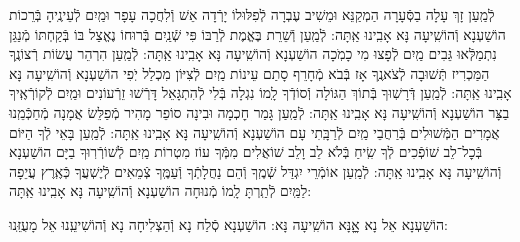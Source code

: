 \documentclass[twoside, openany, parskip=half, 11pt]{book}
\begin{document}
\begin{small}
לְֿמַֽעַן זָךְ עָלָה בַסְּֿעָרָה הַמְקַנֵּא וּמֵשִׁיב עֶבְרָה
לְֿפִלּוּלוֹ יָרְֿדָה אֵשׁ וְֿלִחֲכָה עָפָר וּמַֽיִם לְֿעֵינֶֽיהָ בְּֿרֵכוֹת הוֹשַׁעְנָא וְֿהוֹשִֽׁיעָה נָּא אָבִֽינוּ אַֽתָּה:
לְֿמַֽעַן וְֿשֵׁרֵת בֶּאֱמֶת לְֿרַבּוֹ פִּי שְֿׁנַֽיִם בְּֿרוּחוֹ נֶאֱצַל בּוֹ
בְּֿקַחְתּוֹ מְֿנַגֵּן נִתְמַלְּֿאוּ גֵּבִים מַֽיִם לְֿפָצוּ מִי כָמֹֽכָה הוֹשַׁעְנָא וְֿהוֹשִֽׁיעָה נָּא אָבִֽינוּ אַֽתָּה:
לְֿמַֽעַן הִרְהֵר עֲשׂוֹת רְֿצוֹנֶֽךָ הַמַּכְרִיז תְּֿשׁוּבָה לְֿצֹאנֶֽךָ
אָז בְּֿבֹא מְֿחָרֵף סָתַם עֵינוֹת מַֽיִם לְֿצִיּוֹן מִכְלַל יֹֽפִי הוֹשַׁעְנָא וְֿהוֹשִֽׁיעָה נָּא אָבִֽינוּ אַֽתָּה:
לְֿמַֽעַן דְּֿרָשֽׁוּךָ בְּֿתוֹךְ הַגּוֹלָה וְֿסוֹדְֿךָ לָֽמוֹ נִגְלָה
בְּֿלִי לְֿהִתְגָּאֵל דָּרְֿשׁוּ זֵרְֿעוֹנִים וּמַֽיִם לְֿקוֹרְֿאֶֽיךָ בַצָּר הוֹשַׁעְנָא וְֿהוֹשִֽׁיעָה נָּא אָבִֽינוּ אַֽתָּה:
לְֿמַֽעַן גָּמַר חׇכְמָה וּבִינָה סוֹפֵר מָהִיר מְֿפַלֵּשׂ אֲמָנָה
מְֿחַכְּֿמֵֽנוּ אֲמָרִים הַמְּֿשׁוּלִים בְּֿרַחֲבֵי מַֽיִם לְֿרַבָּֽתִי עָם הוֹשַׁעְנָא וְֿהוֹשִֽׁיעָה נָּא אָבִֽינוּ אַֽתָּה:
לְֿמַֽעַן בָּאֵי לְֿךָ הַיּוֹם בְּֿכׇל־לֵב שׁוֹפְֿכִים לְֿךָ שִֽׂיחַ בְּֿלֹא לֵב וָלֵב
שׁוֹאֲלִים מִמְּֿךָ עוֹז מִטְרוֹת מַֽיִם לְֿשׁוֹרְֿרֽוּךָ בַיָּם הוֹשַׁעְנָא וְֿהוֹשִֽׁיעָה נָּא אָבִֽינוּ אַֽתָּה:
לְֿמַֽעַן אוֹמְֿרֵי יִגְדַּל שְֿׁמֶֽךָ וְֿהֵם נַחֲלָתְֿךָ וְֿעַמֶּֽךָ
צְֿמֵאִים לְֿיֶשְׁעֲךָ כְּֿאֶֽרֶץ עֲיֵפָה לַמַּֽיִם לְֿתַֽרְתָּ לָֽמוֹ מְֿנוּחָה הוֹשַׁעְנָא וְֿהוֹשִֽׁיעָה נָּא אָבִֽינוּ אַֽתָּה:

\end{small}

\begin{large}
\shatzvkahal
הוֹשַׁעְנָא אֵל נָא אׇׇָנָּא הוֹשִֽׁיעָה נָּא:
הוֹשַׁעְנָא סְֿלַח נָא וְֿהַצְלִיחָה נָא וְֿהוֹשִׁיעֵֽנוּ אֵל מָעֻזֵּֽנוּ:

\end{large}
\end{document}
